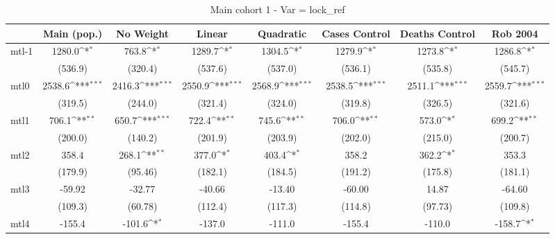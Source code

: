 \documentclass{article}
\begin{document}
{
\def\sym#1{\ifmmode^{#1}\else\(^{#1}\)\fi}
\begin{longtable}{l*{7}{c}}
\caption{Main cohort 1 - Var = lock\_ref}\\
\hline\hline\endfirsthead\hline\endhead\hline\endfoot\endlastfoot
                &\multicolumn{1}{c}{Main (pop.)}&\multicolumn{1}{c}{No Weight}&\multicolumn{1}{c}{Linear}&\multicolumn{1}{c}{Quadratic}&\multicolumn{1}{c}{Cases Control}&\multicolumn{1}{c}{Deaths Control}&\multicolumn{1}{c}{Rob 2004}\\
\hline
mtl-1           &   1280.0\sym{*}  &    763.8\sym{*}  &   1289.7\sym{*}  &   1304.5\sym{*}  &   1279.9\sym{*}  &   1273.8\sym{*}  &   1286.8\sym{*}  \\
                &  (536.9)         &  (320.4)         &  (537.6)         &  (537.0)         &  (536.1)         &  (535.8)         &  (545.7)         \\
mtl0            &   2538.6\sym{***}&   2416.3\sym{***}&   2550.9\sym{***}&   2568.9\sym{***}&   2538.5\sym{***}&   2511.1\sym{***}&   2559.7\sym{***}\\
                &  (319.5)         &  (244.0)         &  (321.4)         &  (324.0)         &  (319.8)         &  (326.5)         &  (321.6)         \\
mtl1            &    706.1\sym{**} &    650.7\sym{***}&    722.4\sym{**} &    745.6\sym{**} &    706.0\sym{**} &    573.0\sym{*}  &    699.2\sym{**} \\
                &  (200.0)         &  (140.2)         &  (201.9)         &  (203.9)         &  (202.0)         &  (215.0)         &  (200.7)         \\
mtl2            &    358.4         &    268.1\sym{**} &    377.0\sym{*}  &    403.4\sym{*}  &    358.2         &    362.2\sym{*}  &    353.3         \\
                &  (179.9)         &  (95.46)         &  (182.1)         &  (184.5)         &  (191.2)         &  (175.8)         &  (181.1)         \\
mtl3            &   -59.92         &   -32.77         &   -40.66         &   -13.40         &   -60.00         &    14.87         &   -64.60         \\
                &  (109.3)         &  (60.78)         &  (112.4)         &  (117.3)         &  (114.8)         &  (97.73)         &  (109.8)         \\
mtl4            &   -155.4         &   -101.6\sym{*}  &   -137.0         &   -111.0         &   -155.4         &   -110.0         &   -158.7\sym{*}  \\

\end{longtable}}
\end{document}
